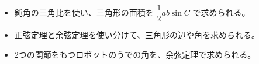 \makeatletter
\newcommand\bkivhline[1]{\par\addvspace{3pt}{\centering #1\par}\addvspace{3pt}\noindent\ignorespaces}
\newcommand\bkivhstep[2]{\par\addvspace{6pt}\Needspace{4\baselineskip}\noindent
  {\bkcircled[bkOrange]{#1}\enspace\sffamily\bfseries\color{bkOrange!75!black}#2}\par\nobreak\vspace{2pt}}
\newcommand\bkivhhead[1]{\par\addvspace{4pt}\Needspace{5\baselineskip}\noindent\textbf{#1}\par\nobreak}
\newcommand\bkivhright[3]{\draw[bkInk, line width=0.5pt] ($#1+(#2:#3)$) -- ++(#2+90:#3) -- ++(#2+180:#3);}
\newcommand\bkivharm[5]{%
  \coordinate (O) at (0,0);
  \coordinate (E) at ({#1*cos(#3)},{#1*sin(#3)});
  \coordinate (P) at ($(E)+({#2*cos(#3+#4)},{#2*sin(#3+#4)})$);
  \draw[#5, line width=3.2pt, line cap=round] (O) -- (E) -- (P);
  \fill[bkGray!70] (-4,-3) rectangle (4,0);
  \filldraw[fill=white, draw=bkInk, line width=0.7pt] (O) circle (1.6);
  \filldraw[fill=white, draw=bkInk, line width=0.7pt] (E) circle (1.4);
  \fill[bkInk] (P) circle (1.1);}
\makeatother


\begin{goal}
\begin{itemize}[label={\color{\bkTT}●}, leftmargin=1.6\zw, itemsep=0pt, topsep=1pt]
\item {}\enspace 鈍角の三角比を使い、三角形の面積を $\dfrac{1}{2}ab\sin C$ で求められる。
\item {}\enspace 正弦定理と余弦定理を使い分けて、三角形の辺や角を求められる。
\item {}\enspace 2つの関節をもつロボットのうでの角を、余弦定理で求められる。
\end{itemize}
\end{goal}

